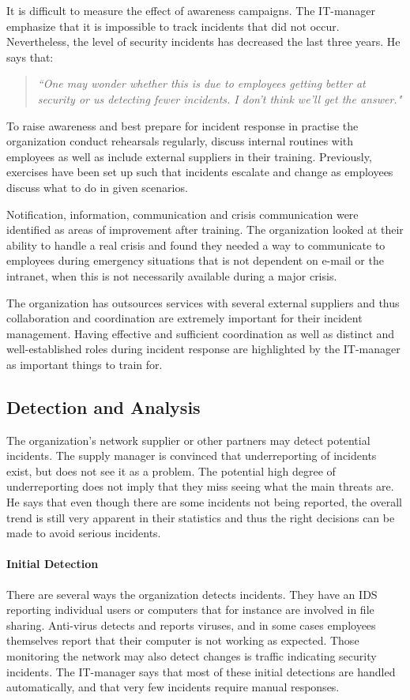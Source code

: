 It is difficult to measure the effect of awareness campaigns. The IT-manager emphasize that it is impossible to track incidents that did not occur. Nevertheless, the level of security incidents has decreased the last three years. He says that:
\begin{quote}
\textit{``One may wonder whether this is due to employees getting better at security or us detecting fewer incidents. I don't think we'll get the answer."}
\end{quote}
 
To raise awareness and best prepare for incident response in practise the organization conduct rehearsals regularly, discuss internal routines with employees as well as include external suppliers in their training. Previously, exercises have been set up such that incidents escalate and change as employees discuss what to do in given scenarios.%

Notification, information, communication and crisis communication were identified as areas of improvement after training. The organization looked at their ability to handle a real crisis and found they needed a way to communicate to employees during emergency situations that is not dependent on e-mail or the intranet, when this is not necessarily available during a major crisis.

The organization has outsources services with several external suppliers and thus collaboration and coordination are extremely important for their incident management. Having effective and sufficient coordination as well as distinct and well-established roles during incident response are highlighted by the IT-manager as important things to train for.

\subsection{Detection and Analysis}
The organization's network supplier or other partners may detect potential incidents. The supply manager is convinced that underreporting of incidents exist, but does not see it as a problem. The potential high degree of underreporting does not imply that they miss seeing what the main threats are. He says that even though there are some incidents not being reported, the overall trend is still very apparent in their statistics and thus the right decisions can be made to avoid serious incidents. 

\paragraph{Initial Detection}
There are several ways the organization detects incidents. They have an \ac{IDS} reporting individual users or computers that for instance are involved in file sharing. Anti-virus detects and reports viruses, and in some cases employees themselves report that their computer is not working as expected. Those monitoring the network may also detect changes is traffic indicating security incidents. The IT-manager says that most of these initial detections are handled automatically, and that very few incidents require manual responses. 

